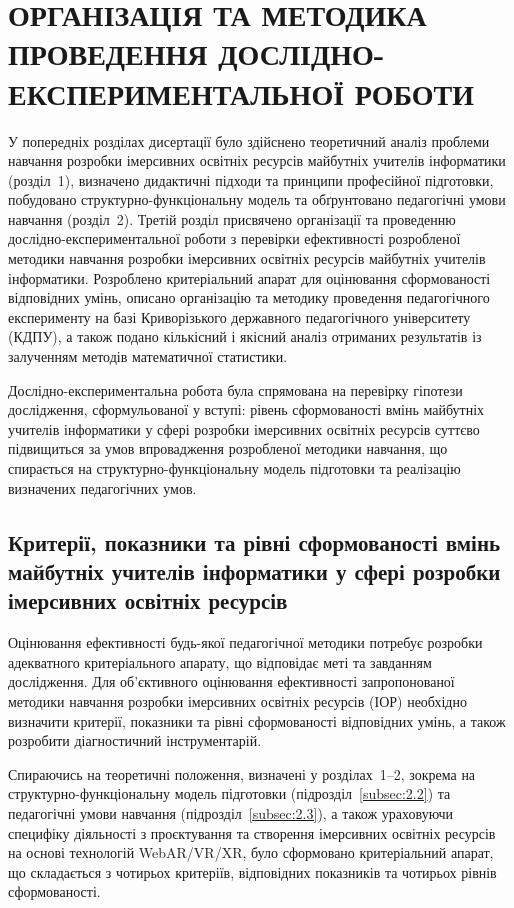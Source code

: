 \section{ОРГАНІЗАЦІЯ ТА МЕТОДИКА ПРОВЕДЕННЯ ДОСЛІДНО-ЕКСПЕРИМЕНТАЛЬНОЇ РОБОТИ}\label{chap3}

У попередніх розділах дисертації було здійснено теоретичний аналіз проблеми навчання розробки імерсивних освітніх ресурсів майбутніх учителів інформатики (розділ~1), визначено дидактичні підходи та принципи професійної підготовки, побудовано структурно-функціональну модель та обґрунтовано педагогічні умови навчання (розділ~2). Третій розділ присвячено організації та проведенню дослідно-експериментальної роботи з перевірки ефективності розробленої методики навчання розробки імерсивних освітніх ресурсів майбутніх учителів інформатики. Розроблено критеріальний апарат для оцінювання сформованості відповідних умінь, описано організацію та методику проведення педагогічного експерименту на базі Криворізького державного педагогічного університету (КДПУ), а також подано кількісний і якісний аналіз отриманих результатів із залученням методів математичної статистики.

Дослідно-експериментальна робота була спрямована на перевірку гіпотези дослідження, сформульованої у вступі: рівень сформованості вмінь майбутніх учителів інформатики у сфері розробки імерсивних освітніх ресурсів суттєво підвищиться за умов впровадження розробленої методики навчання, що спирається на структурно-функціональну модель підготовки та реалізацію визначених педагогічних умов.

\subsection{Критерії, показники та рівні сформованості вмінь майбутніх учителів інформатики у сфері розробки імерсивних освітніх ресурсів}\label{sec:3.1}

Оцінювання ефективності будь-якої педагогічної методики потребує розробки адекватного критеріального апарату, що відповідає меті та завданням дослідження. Для об'єктивного оцінювання ефективності запропонованої методики навчання розробки імерсивних освітніх ресурсів (ІОР) необхідно визначити критерії, показники та рівні сформованості відповідних умінь, а також розробити діагностичний інструментарій.

Спираючись на теоретичні положення, визначені у розділах~1--2, зокрема на структурно-функціональну модель підготовки (підрозділ~\ref{subsec:2.2}) та педагогічні умови навчання (підрозділ~\ref{subsec:2.3}), а також ураховуючи специфіку діяльності з проєктування та створення імерсивних освітніх ресурсів на основі технологій WebAR/VR/XR, було сформовано критеріальний апарат, що складається з чотирьох критеріїв, відповідних показників та чотирьох рівнів сформованості.

